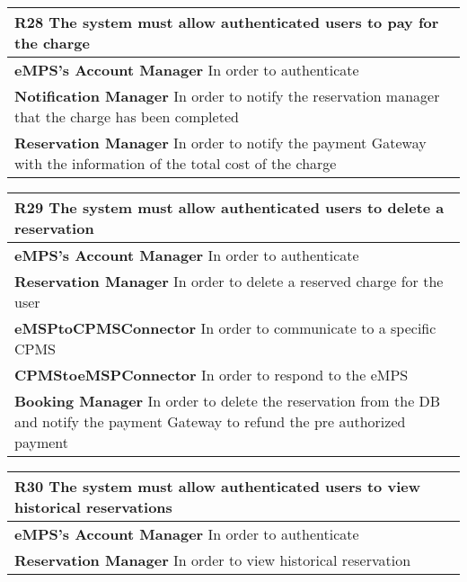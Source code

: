 \begin{table}[H]
    \begin{tabularx}{\textwidth}{X}
        \toprule
        \textbf{R28} The system must allow authenticated users to pay for the charge        \\ \midrule
        \textbf{eMPS's Account Manager} In order to authenticate\\  
        \textbf{Notification Manager} In order to notify the reservation manager that the charge has been completed\\
        \textbf{Reservation Manager} In order to notify the payment Gateway with the information of the total cost of the charge\\
    \end{tabularx}
\end{table}
\begin{table}[H]
    \begin{tabularx}{\textwidth}{X}
        \toprule
        \textbf{R29} The system must allow authenticated users to delete a reservation        \\ \midrule
        \textbf{eMPS's Account Manager} In order to authenticate\\  
        \textbf{Reservation Manager} In order to delete a reserved charge for the user  \\ 
        \textbf{eMSPtoCPMSConnector} In order to communicate to a specific CPMS \\ 
        \textbf{CPMStoeMSPConnector} In order to respond to the eMPS \\
        \textbf{Booking Manager} In order to delete the reservation from the DB and notify the payment Gateway to refund the pre authorized payment\\               
       \end{tabularx}
\end{table}
\begin{table}[H]
    \begin{tabularx}{\textwidth}{X}
        \toprule
        \textbf{R30} The system must allow authenticated users to view historical reservations        \\ \midrule
        \textbf{eMPS's Account Manager} In order to authenticate\\  
        \textbf{Reservation Manager} In order to view historical reservation \\ 
       \end{tabularx}
\end{table}
